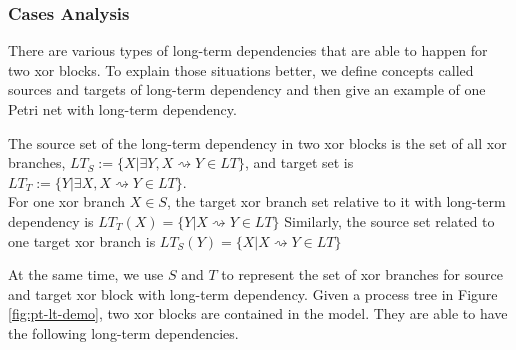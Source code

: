 \subsubsection{Cases Analysis}
There are various types  of long-term dependencies that are able to happen for two xor blocks. To explain those situations better, we define concepts called sources and targets of long-term dependency and then give an example of one Petri net with long-term dependency.
\begin{definition}
	The source set of the long-term dependency in two xor blocks is the set of all  xor branches, $LT_S:= \{X \vert \exists Y, X\rightsquigarrow Y  \in LT \} $, and target set is $LT_T:= \{Y \vert \exists X, X\rightsquigarrow Y \in LT \} $. \\
	For one xor branch $X \in S$, the target xor branch set relative to it with long-term dependency is 
	$ LT_T(X)= \{Y \vert  X\rightsquigarrow Y \in LT \}$
	Similarly, the source set related to one target xor branch is
	$ LT_S(Y)= \{X \vert  X\rightsquigarrow Y \in LT \}$
\end{definition}
At the same time, we use $S $ and $T$ to represent the set of xor branches for source and target xor block with long-term dependency.
Given a process tree in Figure \ref{fig:pt-lt-demo}, two xor blocks are contained in the model. They are able to have the following long-term dependencies.
